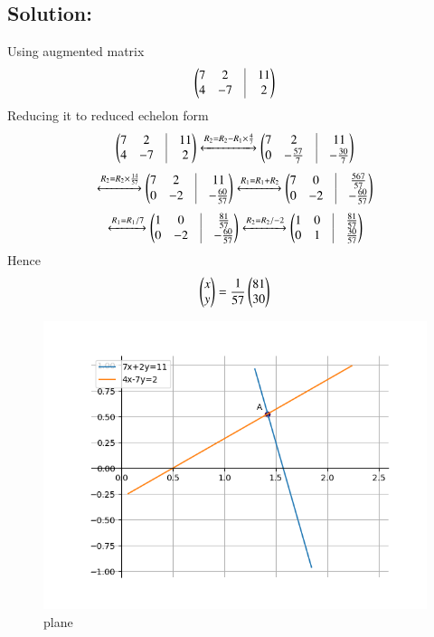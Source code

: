 \documentclass[journal]{IEEEtran}
\begin{document}
\subsection*{\textbf{Solution:}} 
Using augmented matrix
\begin{align}
   \myvec{7 & 2 &\vrule &11 \\
   4 & -7 &\vrule &2}
\end{align}
Reducing it to reduced echelon form
\begin{align}
    \myvec{7 & 2 &\vrule &11 \\
   4 & -7 &\vrule &2} \xleftrightarrow{R_2 = R_2- R_1\times \frac{4}{7}} \myvec{7 & 2 &\vrule &11 \\
   0 & -\frac{57}{7} &\vrule &-\frac{30}{7}}
\end{align}
\begin{align}
\xleftrightarrow{R_2=R_2\times \frac{14}{57}} \myvec{7 & 2 &\vrule &11 \\
   0 & -2 &\vrule &-\frac{60}{57}}
    \xleftrightarrow{R_1 = R_1+ R_2} \myvec{7 & 0 &\vrule &\frac{567}{57} \\
   0 & -2 &\vrule &-\frac{60}{57}} 
\end{align}
\begin{align}
    \xleftrightarrow{R_1 = R_1/7} \myvec{1 & 0 &\vrule &\frac{81}{57} \\
   0 & -2 &\vrule &-\frac{60}{57}} \xleftrightarrow{R_2 = R_2/-2} \myvec{1 & 0 &\vrule &\frac{81}{57} \\
   0 & 1 &\vrule &\frac{30}{57}} 
\end{align}
Hence 
\begin{align}
    \begin{pmatrix}x \\y\end{pmatrix} = \frac{1}{57} \begin{pmatrix}81\\30\end{pmatrix}
\end{align}
\newpage
\begin{figure}[H]
\centering
\includegraphics[width=0.7\columnwidth]{figs/fig.png} 
\caption{plane}
\label{}
\end{figure}
\end{document}
